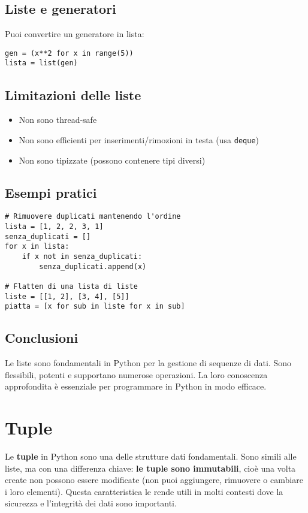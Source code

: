 \documentclass[a4paper,12pt]{article}
\begin{document}
\subsection*{Liste e generatori}
Puoi convertire un generatore in lista:
\begin{lstlisting}
gen = (x**2 for x in range(5))
lista = list(gen)
\end{lstlisting}

\subsection*{Limitazioni delle liste}
\begin{itemize}
    \item Non sono thread-safe
    \item Non sono efficienti per inserimenti/rimozioni in testa (usa \texttt{deque})
    \item Non sono tipizzate (possono contenere tipi diversi)
\end{itemize}

\subsection*{Esempi pratici}
\begin{lstlisting}
# Rimuovere duplicati mantenendo l'ordine
lista = [1, 2, 2, 3, 1]
senza_duplicati = []
for x in lista:
    if x not in senza_duplicati:
        senza_duplicati.append(x)

# Flatten di una lista di liste
liste = [[1, 2], [3, 4], [5]]
piatta = [x for sub in liste for x in sub]
\end{lstlisting}

\subsection*{Conclusioni}
Le liste sono fondamentali in Python per la gestione di sequenze di dati. Sono flessibili, potenti e supportano numerose operazioni. La loro conoscenza approfondita è essenziale per programmare in Python in modo efficace.

\section{Tuple}
Le \textbf{tuple} in Python sono una delle strutture dati fondamentali. Sono simili alle liste, ma con una differenza chiave: \textbf{le tuple sono immutabili}, cioè una volta create non possono essere modificate (non puoi aggiungere, rimuovere o cambiare i loro elementi). Questa caratteristica le rende utili in molti contesti dove la sicurezza e l'integrità dei dati sono importanti.
\end{document}
